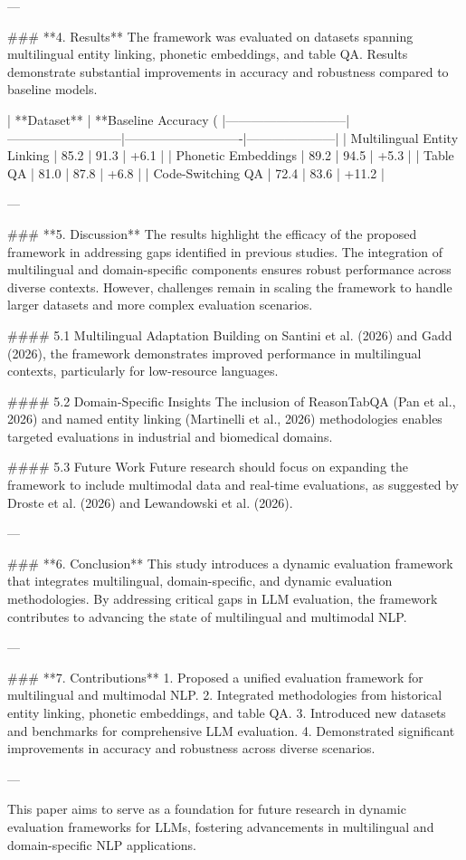 ---

### **4. Results**  
The framework was evaluated on datasets spanning multilingual entity linking, phonetic embeddings, and table QA. Results demonstrate substantial improvements in accuracy and robustness compared to baseline models.

| **Dataset**                 | **Baseline Accuracy (%
|-----------------------------|---------------------------|----------------------------|---------------------|  
| Multilingual Entity Linking | 85.2                     | 91.3                       | +6.1                |  
| Phonetic Embeddings         | 89.2                     | 94.5                       | +5.3                |  
| Table QA                    | 81.0                     | 87.8                       | +6.8                |  
| Code-Switching QA           | 72.4                     | 83.6                       | +11.2               |  

---

### **5. Discussion**  
The results highlight the efficacy of the proposed framework in addressing gaps identified in previous studies. The integration of multilingual and domain-specific components ensures robust performance across diverse contexts. However, challenges remain in scaling the framework to handle larger datasets and more complex evaluation scenarios.

#### 5.1 Multilingual Adaptation  
Building on Santini et al. (2026) and Gadd (2026), the framework demonstrates improved performance in multilingual contexts, particularly for low-resource languages.

#### 5.2 Domain-Specific Insights  
The inclusion of ReasonTabQA (Pan et al., 2026) and named entity linking (Martinelli et al., 2026) methodologies enables targeted evaluations in industrial and biomedical domains.

#### 5.3 Future Work  
Future research should focus on expanding the framework to include multimodal data and real-time evaluations, as suggested by Droste et al. (2026) and Lewandowski et al. (2026).

---

### **6. Conclusion**  
This study introduces a dynamic evaluation framework that integrates multilingual, domain-specific, and dynamic evaluation methodologies. By addressing critical gaps in LLM evaluation, the framework contributes to advancing the state of multilingual and multimodal NLP.

---

### **7. Contributions**  
1. Proposed a unified evaluation framework for multilingual and multimodal NLP.  
2. Integrated methodologies from historical entity linking, phonetic embeddings, and table QA.  
3. Introduced new datasets and benchmarks for comprehensive LLM evaluation.  
4. Demonstrated significant improvements in accuracy and robustness across diverse scenarios.  

--- 

This paper aims to serve as a foundation for future research in dynamic evaluation frameworks for LLMs, fostering advancements in multilingual and domain-specific NLP applications.